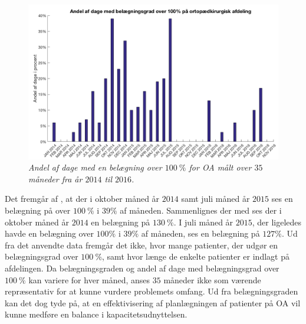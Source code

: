 \begin{figure}[H]
	\centering
	\includegraphics[scale=.35]{figures/andelAfDage.png}
	\caption{\textit{Andel af dage med en belægning over $100~\%$ for OA målt over $35$ måneder fra år $2014$ til $2016$.}\cite{SDS2015}}
	\label{andeldage}
\end{figure}

\noindent
Det fremgår af , at der i oktober måned år $2014$ samt juli måned år $2015$ ses en belægning på over $100~\%$ i $39\%$ af måneden. Sammenlignes der med  ses der i oktober måned år $2014$ en belægning på $130~\%$. I juli måned år $2015$, der ligeledes havde en belægning over $100\%$ i $39\%$ af måneden, ses en belægning på $127\%$. 
Ud fra det anvendte data fremgår det ikke, hvor mange patienter, der udgør en belægningsgrad over $100~\%$, samt hvor længe de enkelte patienter er indlagt på afdelingen. Da belægningsgraden og andel af dage med belægningsgrad over $100~\%$ kan variere for hver måned, anses $35$ måneder ikke som værende repræsentativ for at kunne vurdere problemets omfang. Ud fra belægningsgraden kan det dog tyde på, at en effektivisering af planlægningen af patienter på OA vil kunne medføre en balance i kapacitetsudnyttelsen.
